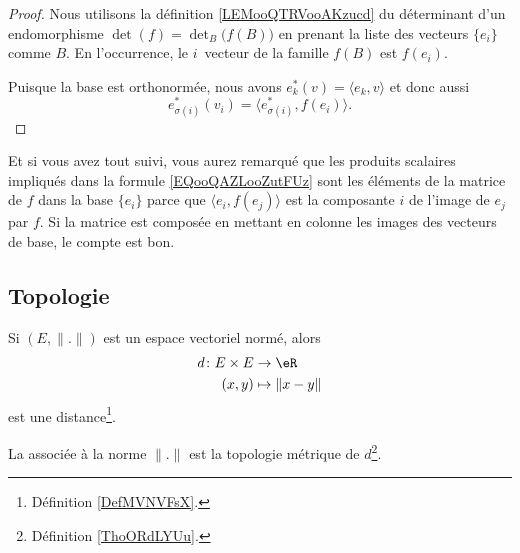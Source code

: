\begin{proof}
	Nous utilisons la définition \ref{LEMooQTRVooAKzucd} du déterminant d'un endomorphisme \( \det(f)=\det_B\big( f(B) \big)\) en prenant la liste des vecteurs \( \{ e_i \}\) comme \( B\). En l'occurrence, le \( i\)\ieme\ vecteur de la famille \( f(B)\) est \( f(e_i)\).

	Puisque la base est orthonormée, nous avons \( e^*_k(v)=\langle e_k, v\rangle \) et donc aussi
	\begin{equation}
		e^*_{\sigma(i)}(v_i)=\langle e_{\sigma(i)}^*, f(e_i)\rangle.
	\end{equation}
\end{proof}

Et si vous avez tout suivi, vous aurez remarqué que les produits scalaires impliqués dans la formule \eqref{EQooQAZLooZutFUz} sont les éléments de la matrice de \( f\) dans la base \( \{ e_i \}\) parce que \( \langle e_i, f(e_j)\rangle \) est la composante \( i\) de l'image de \( e_j\) par \( f\). Si la matrice est composée en mettant en colonne les images des vecteurs de base, le compte est bon.

\subsection{Topologie}

\begin{propositionDef}	\label{PROPooEKTIooEKmWfn}
	Si \( (E,\| . \|)\) est un espace vectoriel normé, alors
	\begin{equation}
		\begin{aligned}
			d\colon E\times E & \to \eR           \\
			(x,y)             & \mapsto \| x-y \|
		\end{aligned}
	\end{equation}
	est une distance\footnote{Définition \ref{DefMVNVFsX}.}.

	La  associée à la norme \( \| . \|\) est la topologie métrique de \( d\)\footnote{Définition \ref{ThoORdLYUu}.}.
\end{propositionDef}


